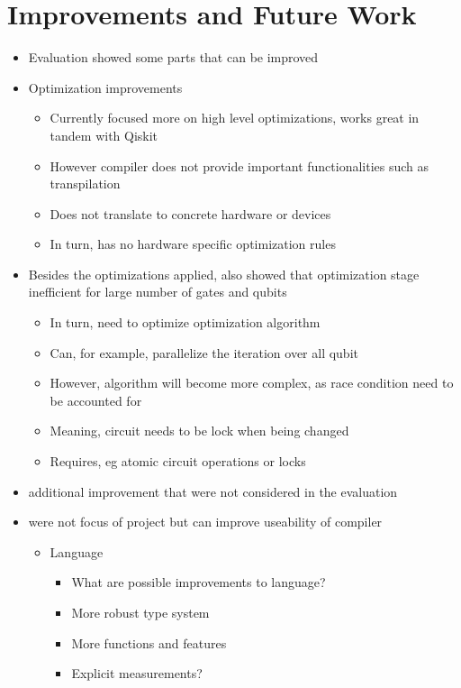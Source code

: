 \section{Improvements and Future Work}
\begin{itemize}
    \item Evaluation showed some parts that can be improved
    \item Optimization improvements
    \begin{itemize}
        \item Currently focused more on high level optimizations, works great in tandem with Qiskit
        \item However compiler does not provide important functionalities such as transpilation 
        \item Does not translate to concrete hardware or devices
        \item In turn, has no hardware specific optimization rules
    \end{itemize} 
    \item Besides the optimizations applied, also showed that optimization stage inefficient for large number of gates and qubits
    \begin{itemize}
        \item In turn, need to optimize optimization algorithm
        \item Can, for example, parallelize the iteration over all qubit
        \item However, algorithm will become more complex, as race condition need to be accounted for
        \item Meaning, circuit needs to be lock when being changed
        \item Requires, eg atomic circuit operations or locks
    \end{itemize}
    \item additional improvement that were not considered in the evaluation
    \item were not focus of project but can improve useability of compiler 
    \begin{itemize}
        \item Language
        \begin{itemize}
            \item What are possible improvements to language?
            \item More robust type system
            \item More functions and features
            \item Explicit measurements?

\end{itemize}
\end{itemize}
\end{itemize}
